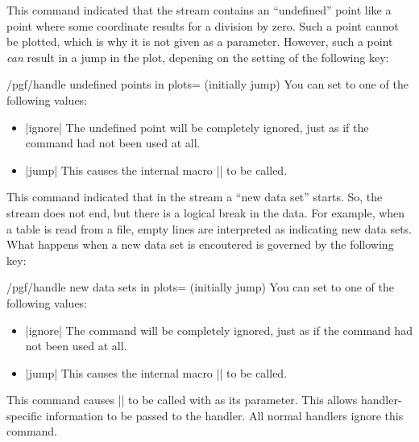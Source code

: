 \begin{command}{\pgfplotstreampointundefined}
  This command indicated that the stream contains an ``undefined''
  point like a point where some coordinate results for a division by
  zero. Such a point cannot be plotted, which is why it is not given
  as a parameter. However, such a point \emph{can} result in a jump in
  the plot, depening on the setting of the following key:
  \begin{key}{/pgf/handle undefined points in plots=
      (initially jump)}
    You can set  to one of the following values:
    \begin{itemize}
    \item |ignore| The undefined point will be completely ignored, just as if
      the command had not been used at all.
    \item |jump| This causes the internal macro |\pgf@plotstreamjump|
      to be called. 
    \end{itemize}
  \end{key}
\end{command}

\begin{command}{\pgfplotstreamnewdataset}
  This command indicated that in the stream a ``new data set'' starts.
  So, the stream does not end, but there is a logical break in the
  data. For example, when a table is read from a file, empty lines are
  interpreted as indicating new data sets. What happens when a new
  data set is encoutered is governed by the following key:
  \begin{key}{/pgf/handle new data sets in plots=
      (initially jump)}
    You can set  to one of the following values:
    \begin{itemize}
    \item |ignore| The command will be completely ignored, just as if
      the command had not been used at all.
    \item |jump| This causes the internal macro |\pgf@plotstreamjump|
      to be called. 
    \end{itemize}
  \end{key}
\end{command}

\begin{command}{\pgfplotstreamspecial{}}
  This command causes |\pgf@plotstreamspecial| to be called with
   as its parameter. This allows handler-specific
  information to be passed to the handler. All normal handlers ignore
  this command.
\end{command}

